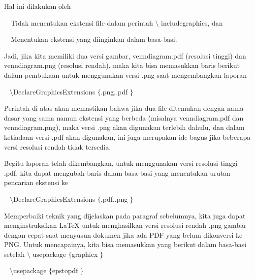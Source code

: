 \vspace{12pt}
\noindent 
Hal ini dilakukan oleh \par
\vspace{12pt}
\noindent 
 $  $ $  $ $  $ $  $Tidak menentukan ekstensi file dalam perintah  $  \setminus $ includegraphics, dan \par
\noindent 
 $  $ $  $ $  $ $  $Menentukan ekstensi yang diinginkan dalam basa-basi. \par
\vspace{12pt}
\noindent 
Jadi, jika kita memiliki dua versi gambar, venndiagram.pdf (resolusi tinggi) dan venndiagram.png (resolusi rendah), maka kita bisa memasukkan baris berikut dalam pembukaan untuk menggunakan versi .png saat mengembangkan laporan - \par
\vspace{28pt}
\noindent 
~  $  \setminus $DeclareGraphicsExtensions $  \{  $.png,.pdf $  \}  $ \par
\noindent 
Perintah di atas akan memastikan bahwa jika dua file ditemukan dengan nama dasar yang sama namun ekstensi yang berbeda (misalnya venndiagram.pdf dan venndiagram.png), maka versi .png akan digunakan terlebih dahulu, dan dalam ketiadaan versi .pdf akan digunakan, ini juga merupakan ide bagus jika beberapa versi resolusi rendah tidak tersedia. \par
\vspace{12pt}
\noindent 
Begitu laporan telah dikembangkan, untuk menggunakan versi resolusi tinggi .pdf, kita dapat mengubah baris dalam basa-basi yang menentukan urutan pencarian ekstensi ke \par
\vspace{12pt}
\vspace{16pt}
\noindent 
~  $  \setminus $DeclareGraphicsExtensions $  \{  $.pdf,.png $  \}  $ \par
\vspace{12pt}
\vspace{12pt}
\vspace{16pt}
\noindent 
Memperbaiki teknik yang dijelaskan pada paragraf sebelumnya, kita juga dapat menginstruksikan LaTeX untuk menghasilkan versi resolusi rendah .png gambar dengan cepat saat menyusun dokumen jika ada PDF yang belum dikonversi ke PNG. Untuk mencapainya, kita bisa memasukkan yang berikut dalam basa-basi setelah  $  \setminus $ usepackage  $  \{  $graphicx $  \}  $ \par
\vspace{16pt}
\noindent 
~  $  \setminus $usepackage $  \{  $epstopdf $  \}  $ \par
